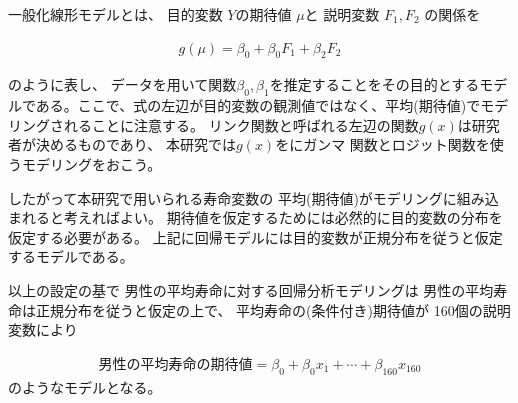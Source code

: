 \documentclass[a4j,11pt,mc]{jreport}
\begin{document}
一般化線形モデルとは、
目的変数
$Y$の期待値
$\mu$と
説明変数
$F_1, F_2$
の関係を

\begin{eqnarray}
g(\mu)=\beta_0 +\beta_0F_1 + \beta_2 F_2
\end{eqnarray}


のように表し、
データを用いて関数$\beta_0 ,\beta_1 $を推定することをその目的とするモデルである。ここで、式の左辺が目的変数の観測値ではなく、平均(期待値)でモデリングされることに注意する。
リンク関数と呼ばれる左辺の関数$g(x)$は研究者が決めるものであり、
本研究では$g(x)$をにガンマ 関数とロジット関数を使うモデリングをおこう。

したがって本研究で用いられる寿命変数の
平均(期待値)がモデリングに組み込まれると考えればよい。
期待値を仮定するためには必然的に目的変数の分布を仮定する必要がある。
上記に回帰モデルには目的変数が正規分布を従うと仮定するモデルである。

以上の設定の基で
男性の平均寿命に対する回帰分析モデリングは
男性の平均寿命は正規分布を従うと仮定の上で、
平均寿命の(条件付き)期待値が
160個の説明変数により

\begin{eqnarray}
\mbox{男性の平均寿命の期待値}=
\beta_0 +\beta_0x_1 +\cdots + \beta_{160} x_{160}
\end{eqnarray}
のようなモデルとなる。
\end{document}
